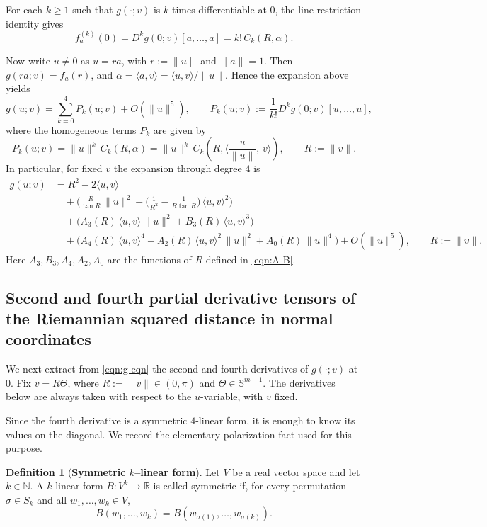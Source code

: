 \documentclass{amsart}
\theoremstyle{definition}
\newtheorem{definition}[theorem]{Definition}
\theoremstyle{remark}
\newcommand\0{\boldsymbol{0}}
\begin{document}
For each \(k\ge 1\) such that \(g(\cdot;v)\) is \(k\) times differentiable at \(0\), the line-restriction identity gives
\[
f_{a}^{(k)}(0)=D^{k}g(0;v)[a,\dots,a]=k!\,C_{k}(R,\alpha).
\]

Now write \(u\neq 0\) as \(u=ra\), with \(r:=\|u\|\) and \(\|a\|=1\).  Then \(g(ra;v)=f_a(r)\), and \(\alpha=\langle a,v\rangle=\langle u,v\rangle/\|u\|\).  Hence the expansion above yields
\[
g(u;v)=\sum_{k=0}^{4} P_{k}(u;v)+O(\|u\|^{5}),
\qquad
P_{k}(u;v):=\frac{1}{k!}D^{k}g(0;v)[u,\dots,u],
\]
where the homogeneous terms \(P_k\) are given by
\[
P_{k}(u;v)
= \|u\|^{k} \, C_k(R, \alpha)
=\|u\|^{k}\,C_{k}\!\left(R,\Big\langle\frac{u}{\|u\|},\,v\Big\rangle\right),
\qquad R:=\|v\|.
\]
In particular, for fixed \(v\) the expansion through degree \(4\) is
\begin{equation}\label{eqn:g-eqn}
\boxed{
\begin{aligned}
g(u;v)
&=R^{2}
-2\langle u,v\rangle\\[1mm]
&\quad+\Bigg(\frac{R}{\tan R}\,\|u\|^{2}
+\Big(\frac{1}{R^{2}}-\frac{1}{R\tan R}\Big)\,\langle u,v\rangle^{2}\Bigg)\\[1mm]
&\quad+\Big(A_{3}(R)\,\langle u,v\rangle\,\|u\|^{2}+B_{3}(R)\,\langle u,v\rangle^{3}\Big)\\[1mm]
&\quad+\Big(A_{4}(R)\,\langle u,v\rangle^{4}+A_{2}(R)\,\langle u,v\rangle^{2}\,\|u\|^{2}+A_{0}(R)\,\|u\|^{4}\Big)
+O(\|u\|^{5}),
\qquad R:=\|v\|.
\end{aligned}
}
\end{equation}
Here \(A_{3},B_{3},A_{4},A_{2},A_{0}\) are the functions of \(R\) defined in \eqref{eqn:A-B}.

\subsection{Second and fourth partial derivative tensors of the Riemannian squared distance in normal coordinates}
\label{subsec:derivatives-g}

We next extract from \eqref{eqn:g-eqn} the second and fourth derivatives of \(g(\cdot;v)\) at \(0\).  Fix \(v=R\Theta\), where \(R:=\|v\|\in(0,\pi)\) and \(\Theta\in\mathbb{S}^{m-1}\).  The derivatives below are always taken with respect to the \(u\)-variable, with \(v\) fixed.

Since the fourth derivative is a symmetric \(4\)-linear form, it is enough to know its values on the diagonal.  We record the elementary polarization fact used for this purpose.

\begin{definition}[\textbf{Symmetric $k$--linear form}]
Let \(V\) be a real vector space and let \(k\in\mathbb{N}\).  A \(k\)-linear form \(B:V^k\to\mathbb{R}\) is called symmetric if, for every permutation \(\sigma\in S_k\) and all \(w_1,\dots,w_k\in V\),
\[
B(w_1,\dots,w_k)=B(w_{\sigma(1)},\dots,w_{\sigma(k)}).
\]
\end{definition}
\end{document}
